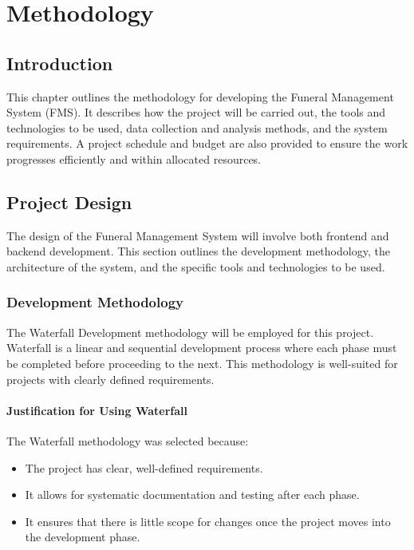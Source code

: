 \documentclass[a4paper,12pt]{report}
\begin{document}
\newpage
\chapter{Methodology}

\section{Introduction}
This chapter outlines the methodology for developing the Funeral Management System (FMS). It describes how the project will be carried out, the tools and technologies to be used, data collection and analysis methods, and the system requirements. A project schedule and budget are also provided to ensure the work progresses efficiently and within allocated resources.

\section{Project Design}
The design of the Funeral Management System will involve both frontend and backend development. This section outlines the development methodology, the architecture of the system, and the specific tools and technologies to be used.

\subsection{Development Methodology}
The Waterfall Development methodology will be employed for this project. Waterfall is a linear and sequential development process where each phase must be completed before proceeding to the next. This methodology is well-suited for projects with clearly defined requirements.

\subsubsection{Justification for Using Waterfall}
The Waterfall methodology was selected because:
\begin{itemize}
    \item The project has clear, well-defined requirements.
    \item It allows for systematic documentation and testing after each phase.
    \item It ensures that there is little scope for changes once the project moves into the development phase.
\end{itemize}

\end{document}
